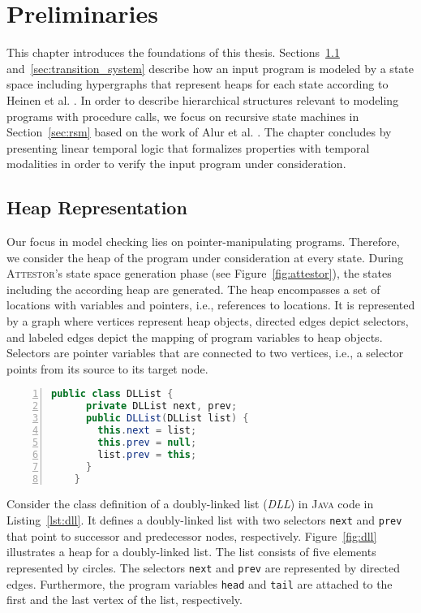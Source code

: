 \documentclass[a4paper, 12pt, twoside]{report}
\begin{document}
	\chapter{Preliminaries}\label{chp:preliminaries}
	
	This chapter introduces the foundations of this thesis. Sections~\ref{sec:heap} and~\ref{sec:transition_system} describe how an input program is modeled by a state space including hypergraphs that represent heaps for each state according to Heinen et al. \cite{heinen2015juggrnaut}. In order to describe hierarchical structures relevant to modeling programs with procedure calls, we focus on recursive state machines in Section~\ref{sec:rsm} based on the work of Alur et al. \cite{alur2001analysis}. The chapter concludes by presenting linear temporal logic that formalizes properties with temporal modalities in order to verify the input program under consideration.
	
	\section{Heap Representation}\label{sec:heap}	
	
	Our focus in model checking lies on pointer-manipulating programs. Therefore, we consider the heap of the program under consideration at every state. During \textsc{Attestor}'s state space generation phase (see Figure~\ref{fig:attestor}), the states including the according heap are generated. The heap encompasses a set of locations with variables and pointers, i.e., references to locations. It is represented by a graph where vertices represent heap objects, directed edges depict selectors, and labeled edges depict the mapping of program variables to heap objects. Selectors are pointer variables that are connected to two vertices, i.e., a selector points from its source to its target node.\\
	
	\begin{lstlisting}[language=Java,numbers=left,
	stepnumber=1,keywordstyle=\color{blue},frame=single,caption={\textsc{Java} class definition for doubly-linked lists.},captionpos=b,label={lst:dll}]
	public class DLList {	
	  private DLList next, prev;	  	
	  public DLList(DLList list) {	
	    this.next = list;
	    this.prev = null;
	    list.prev = this;
	  }
	}
	\end{lstlisting}
	
	Consider the class definition of a doubly-linked list (\textit{DLL}) in \textsc{Java} code in Listing~\ref{lst:dll}. It defines a doubly-linked list with two selectors \texttt{next} and \texttt{prev} that point to successor and predecessor nodes, respectively. Figure~\ref{fig:dll} illustrates a heap for a doubly-linked list. The list consists of five elements represented by circles. The selectors \texttt{next} and \texttt{prev} are represented by directed edges. Furthermore, the program variables \texttt{head} and \texttt{tail} are attached to the first and the last vertex of the list, respectively.\\			
\end{document}
